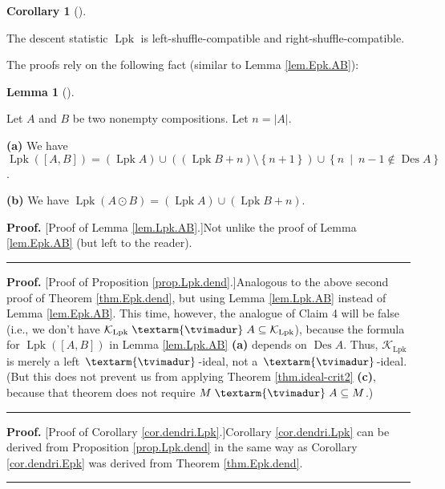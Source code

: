 \documentclass[numbers=enddot,12pt,final,onecolumn,notitlepage]{scrartcl}%
\theoremstyle{definition}
\newtheorem{lem}[theo]{Lemma}
\newenvironment{lemma}[1][]
{\begin{lem}[#1]\begin{leftbar}}
{\end{leftbar}\end{lem}}
\newtheorem{coro}[theo]{Corollary}
\newenvironment{corollary}[1][]
{\begin{coro}[#1]\begin{leftbar}}
{\end{leftbar}\end{coro}}
\newenvironment{proof}[1][Proof]{\noindent\textbf{#1.} }{\ \rule{0.5em}{0.5em}}
\newenvironment{verlong}{}{}
\newcommand{\tvi}{\left. \textarm{\tvimadur} \right.}
\begin{document}
\begin{verlong}
\begin{corollary}
\label{cor.dendri.Lpk}The descent statistic $\operatorname*{Lpk}$ is
left-shuffle-compatible and right-shuffle-compatible.
\end{corollary}

The proofs rely on the following fact (similar to Lemma \ref{lem.Epk.AB}):

\begin{lemma}
\label{lem.Lpk.AB}Let $A$ and $B$ be two nonempty compositions. Let
$n=\left\vert A\right\vert $.

\textbf{(a)} We have $\operatorname*{Lpk}\left(  \left[  A,B\right]  \right)
=\left(  \operatorname*{Lpk}A\right)  \cup\left(  \left(  \operatorname*{Lpk}%
B+n\right)  \setminus\left\{  n+1\right\}  \right)  \cup\left\{
n\ \mid\ n-1\notin\operatorname*{Des}A\right\}  $.

\textbf{(b)} We have $\operatorname*{Lpk}\left(  A\odot B\right)  =\left(
\operatorname*{Lpk}A\right)  \cup\left(  \operatorname*{Lpk}B+n\right)  $.
\end{lemma}

\begin{proof}
[Proof of Lemma \ref{lem.Lpk.AB}.]Not unlike the proof of Lemma
\ref{lem.Epk.AB} (but left to the reader).
\end{proof}

\begin{proof}
[Proof of Proposition \ref{prop.Lpk.dend}.]Analogous to the above second proof
of Theorem \ref{thm.Epk.dend}, but using Lemma \ref{lem.Lpk.AB} instead of
Lemma \ref{lem.Epk.AB}. This time, however, the analogue of Claim 4 will be
false (i.e., we don't have $\mathcal{K}_{\operatorname*{Lpk}}\tvi
A\subseteq\mathcal{K}_{\operatorname*{Lpk}}$), because the formula for
$\operatorname*{Lpk}\left(  \left[  A,B\right]  \right)  $ in Lemma
\ref{lem.Lpk.AB} \textbf{(a)} depends on $\operatorname*{Des}A$. Thus,
$\mathcal{K}_{\operatorname*{Lpk}}$ is merely a left $\tvi$-ideal, not a
$\tvi$-ideal. (But this does not prevent us from applying Theorem
\ref{thm.ideal-crit2} \textbf{(c)}, because that theorem does not require
$M\tvi A\subseteq M$.)
\end{proof}

\begin{proof}
[Proof of Corollary \ref{cor.dendri.Lpk}.]Corollary \ref{cor.dendri.Lpk} can
be derived from Proposition \ref{prop.Lpk.dend} in the same way as Corollary
\ref{cor.dendri.Epk} was derived from Theorem \ref{thm.Epk.dend}.
\end{proof}


\end{verlong}
\end{document}
